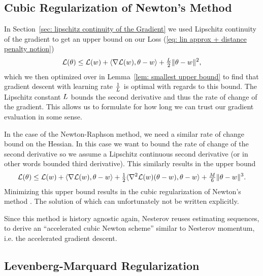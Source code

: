\subsection{Cubic Regularization of Newton's Method}

 In Section~\ref{sec: lipschitz continuity of the Gradient} we used Lipschitz
 continuity of the gradient to get an upper bound on our Loss (\ref{eq: lin
 approx + distance penalty notion})
\begin{align*}
	\mathcal{L}(\theta)
	\le \mathcal{L}(w) + \langle \nabla\mathcal{L}(w), \theta-w \rangle
	+ \tfrac{L}2 \|\theta-w\|^2,
\end{align*}
which we then optimized over in Lemma~\ref{lem: smallest upper bound} to find
that gradient descent with learning rate \(\tfrac1{L}\) is optimal with
regards to this bound. The Lipschitz constant \(L\) bounds the second
derivative and thus the rate of change of the gradient. This allows us to
formulate for how long we can trust our gradient evaluation in some sense.

In the case of the Newton-Raphson method, we need a similar rate of change
bound on the Hessian. In this case we want to bound the rate of change of the
second derivative so we assume a Lipschitz continuous second derivative (or 
in other words bounded third derivative). This similarly results in the upper
bound
\begin{align*}
	\mathcal{L}(\theta)
	\le \mathcal{L}(w) + \langle \nabla\mathcal{L}(w), \theta-w \rangle
	+ \tfrac12\langle \nabla^2\mathcal{L}(w)(\theta-w), \theta-w \rangle
	+ \tfrac{M}6\|\theta-w\|^3.
\end{align*}
Minimizing this upper bound results in the cubic regularization of Newton's method
\parencite[Section 4.1]{nesterovLecturesConvexOptimization2018}.
The solution of which can unfortunately not be written explicitly.

Since this method is history agnostic again, Nesterov reuses estimating
sequences, to derive an ``accelerated cubic Newton scheme'' \parencite[Section
4.2]{nesterovLecturesConvexOptimization2018} similar to Nesterov momentum, i.e.
the accelerated gradient descent.

\subsection{Levenberg-Marquard Regularization}\label{subsec: levenberg-marquard regularization}

